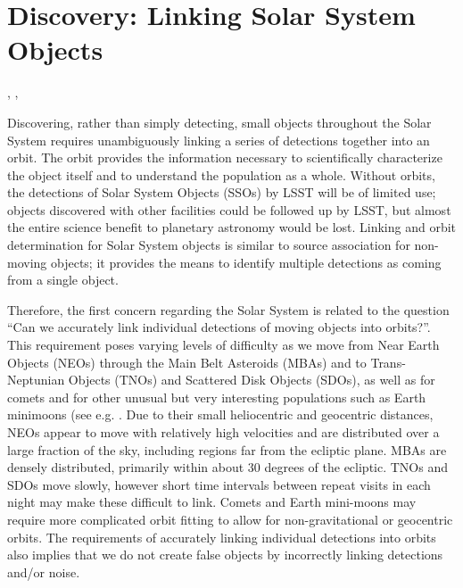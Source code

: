 %
%
%

\section{Discovery: Linking Solar System Objects}
\def\secname{\chpname:discovery}\label{sec:\secname}

,
,

Discovering, rather than simply detecting, small objects throughout
the Solar System requires unambiguously linking a series of detections
together into an orbit. The orbit provides the information necessary
to scientifically characterize the object itself and to understand the
population as a whole. Without orbits, the detections of Solar System
Objects (SSOs) by LSST will be of limited use; objects discovered with
other facilities could be followed up by LSST, but almost the entire
science benefit to planetary astronomy would be lost. Linking and
orbit determination for Solar System objects is similar to source
association for non-moving objects; it provides the means to identify
multiple detections as coming from a single object.

Therefore, the first concern regarding the Solar System is related
to the question ``Can we accurately link individual detections of moving objects into
orbits?''.  This requirement poses varying levels of difficulty as we
move from Near Earth Objects (NEOs) through the Main Belt Asteroids
(MBAs) and to Trans-Neptunian Objects (TNOs) and Scattered Disk Objects
(SDOs), as well as for comets and for other unusual but very
interesting populations such as Earth minimoons
(see e.g. \citet{2014Icar..241..280B, 2017Icar..285...83F}.
Due to their small
heliocentric and geocentric distances, NEOs appear to move with
relatively high velocities and are distributed over a large fraction
of the sky, including regions far from the ecliptic plane. MBAs are densely distributed,
primarily within about 30 degrees of the ecliptic. TNOs and SDOs move
slowly, however short time intervals between repeat visits in each night may make these difficult
to link. Comets and Earth mini-moons may require more complicated
orbit fitting to allow for non-gravitational or geocentric
orbits. The requirements of accurately linking individual detections
into orbits also implies that we do not create false objects by
incorrectly linking detections and/or noise.

